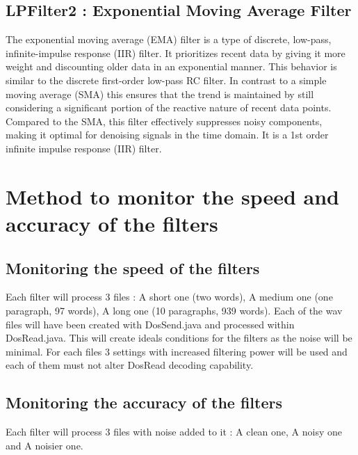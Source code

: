 \subsection{LPFilter2 : Exponential Moving Average Filter}

The exponential moving average (EMA) filter is a type of discrete, low-pass, infinite-impulse response (IIR) filter. It prioritizes recent data by giving it more weight and discounting older data in an exponential manner. This behavior is similar to the discrete first-order low-pass RC filter. In contrast to a simple moving average (SMA) this ensures that the trend is maintained by still considering a significant portion of the reactive nature of recent data points. Compared to the SMA, this filter effectively suppresses noisy components, making it optimal for denoising signals in the time domain. It is a 1st order infinite impulse response (IIR) filter.

\section{Method to monitor the speed and accuracy of the filters}

\subsection{Monitoring the speed of the filters}

Each filter will process 3 files : A short one (two words), A medium one (one paragraph, 97 words), A long one (10 paragraphs, 939 words). Each of the wav files will have been created with DosSend.java and processed within DosRead.java. This will create ideals conditions for the filters as the noise will be minimal. For each files 3 settings with increased filtering power will be used and each of them must not alter DosRead decoding capability.

\subsection{Monitoring the accuracy of the filters}

Each filter will process 3 files with noise added to it : A clean one, A noisy one and A noisier one.

